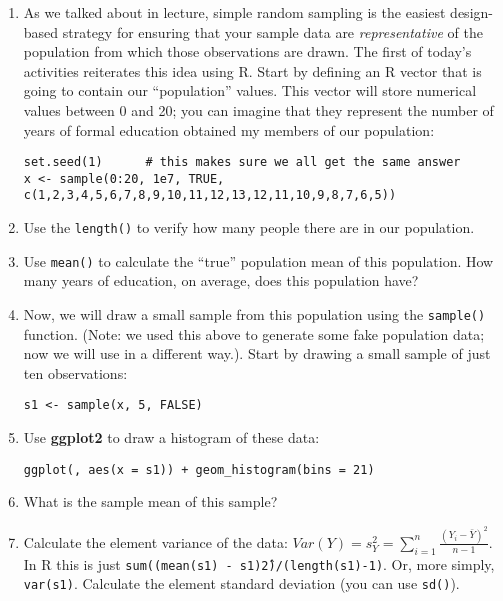 \documentclass[a4paper,12pt]{article}
\begin{document}
\begin{enumerate}
\item As we talked about in lecture, simple random sampling is the easiest design-based strategy for ensuring that your sample data are \textit{representative} of the population from which those observations are drawn. The first of today's activities reiterates this idea using R. Start by defining an R vector that is going to contain our ``population'' values. This vector will store numerical values between 0 and 20; you can imagine that they represent the number of years of formal education obtained my members of our population:

\begin{verbatim}
set.seed(1)      # this makes sure we all get the same answer
x <- sample(0:20, 1e7, TRUE, c(1,2,3,4,5,6,7,8,9,10,11,12,13,12,11,10,9,8,7,6,5))
\end{verbatim}

\item Use the \texttt{length()} to verify how many people there are in our population.

\item Use \texttt{mean()} to calculate the ``true'' population mean of this population. How many years of education, on average, does this population have?

\item Now, we will draw a small sample from this population using the \texttt{sample()} function. (Note: we used this above to generate some fake population data; now we will use in a different way.). Start by drawing a small sample of just ten observations:

\begin{verbatim}
s1 <- sample(x, 5, FALSE)
\end{verbatim}

\item Use \textbf{ggplot2} to draw a histogram of these data:

\begin{verbatim}
ggplot(, aes(x = s1)) + geom_histogram(bins = 21)
\end{verbatim}

\item What is the sample mean of this sample?

\item Calculate the element variance of the data: $Var(Y) = s_Y^2 = \sum_{i=1}^{n} \frac{(Y_i - \bar{Y})^2}{n-1}$. In R this is just \texttt{sum((mean(s1) - s1)\^2)/(length(s1)-1)}. Or, more simply, \texttt{var(s1)}. Calculate the element standard deviation (you can use \texttt{sd()}).


\end{enumerate}
\end{document}
